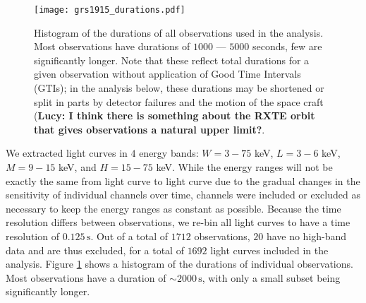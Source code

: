\documentclass[12pt]{emulateapj}
\begin{document}
\begin{figure}[htbp]
\begin{center}
\texttt{[image: grs1915\_durations.pdf]}
\caption{Histogram of the durations of all observations used in the analysis. Most observations have durations of $1000$ --- $5000$ seconds, few are significantly longer. Note that these reflect total durations for a given observation without application of Good Time Intervals (GTIs); in the analysis below, these durations may be shortened or split in parts by detector failures and the motion of the space craft ({\bf Lucy: I think there is something about the RXTE orbit that gives observations a natural upper limit?}.}
\label{fig:obsdurations}
\end{center}
\end{figure}

We extracted light curves in $4$ energy bands: $W = 3 - 75$ keV, $L = 3 - 6$ keV, $M = 9 - 15$ keV, and $H = 15 - 75$ keV. While the energy ranges will not be exactly the same from light curve to light curve due to the gradual changes in the sensitivity of individual channels over time, channels were included or excluded as necessary to keep the energy ranges as constant as possible. Because the time resolution differs between observations, we re-bin all light curves to have a time resolution of $0.125\,\mathrm{s}$. Out of a total of $1712$ observations, $20$ have no high-band data and are thus excluded, for a total of $1692$ light curves included in the analysis. 
Figure \ref{fig:obsdurations} shows a histogram of the durations of individual observations. Most observations have a duration of $\sim\!2000 \,\mathrm{s}$, with only a small subset being significantly longer.
\end{document}
